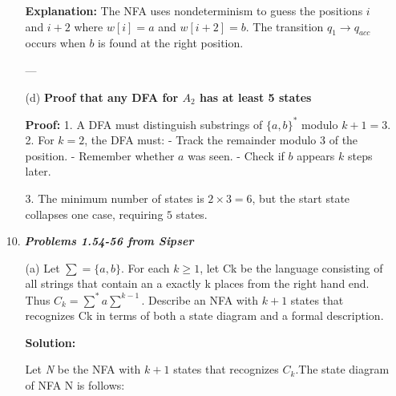 \documentclass[9pt,tikz,border=2mm]{article}
\begin{document}
\begin{enumerate}
\begin{enumerate}
\textbf{Explanation:}  
The NFA uses nondeterminism to guess the positions \( i \) and \( i+2 \) where \( w[i] = a \) and \( w[i+2] = b \). The transition \( q_1 \to q_{acc} \) occurs when \( b \) is found at the right position.

---

\item[(d)] \textbf{ Proof that any DFA for \( A_2 \) has at least 5 states}

\textbf{Proof:}
1. A DFA must distinguish substrings of \( \{a, b\}^* \) modulo \( k+1 = 3 \).
2. For \( k = 2 \), the DFA must:
   - Track the remainder modulo 3 of the position.
   - Remember whether \( a \) was seen.
   - Check if \( b \) appears \( k \) steps later.

3. The minimum number of states is \( 2 \times 3 = 6 \), but the start state collapses one case, requiring \( 5 \) states.

\end{enumerate}
            
        \item[10.] \textbf{\textit{Problems 1.54-56 from Sipser}}
            \begin{enumerate}
                \item[(a)]Let $\sum = \{a, b\}$. For each $k \geq 1$, let Ck be the language consisting of all strings that contain an a exactly k places from the right hand end. Thus $C_k = \sum^* a\sum^{k-1}$. Describe an NFA with $k + 1$ states that recognizes Ck in terms of both a state diagram and a formal description.
                
                \textbf{Solution:}\newline

                Let \textit{N} be the NFA with $k+1$ states that recognizes $C_k$.The state diagram of NFA N is follows:

               \newline


\end{enumerate}
\end{enumerate}
\end{document}
